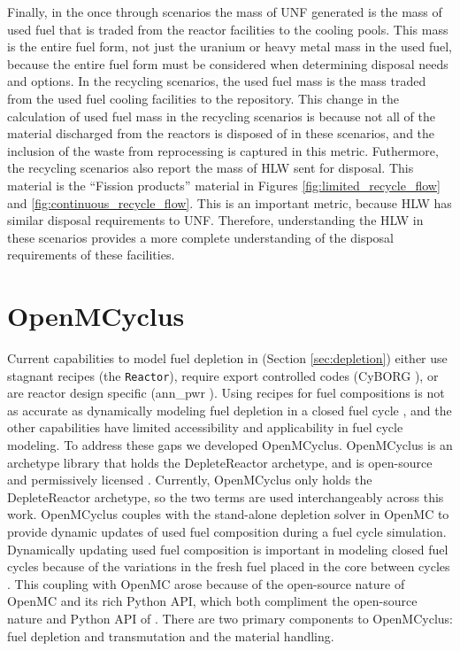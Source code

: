 Finally, in the once through scenarios the mass of \gls{UNF} generated is 
the mass of used fuel that is 
traded from the reactor facilities to the cooling pools. This mass is the 
entire fuel form, not just the uranium or heavy metal mass in the used 
fuel, because the entire fuel form must be considered when determining 
disposal needs and options. In the recycling scenarios, the used fuel 
mass is the mass traded from the used fuel cooling facilities 
to the repository. This change in the calculation of used fuel mass 
in the recycling scenarios is because not all of the material discharged 
from the reactors is disposed of in these scenarios, and the inclusion of 
the waste from reprocessing is captured in this metric. Futhermore, 
the recycling scenarios also report the mass of \gls{HLW} sent 
for disposal. This material is the ``Fission products'' material 
in Figures \ref{fig:limited_recycle_flow} and \ref{fig:continuous_recycle_flow}.
This is an important metric, because \gls{HLW} has similar 
disposal requirements to \gls{UNF}. Therefore, understanding the 
\gls{HLW} in these scenarios provides a more complete understanding 
of the disposal requirements of these facilities. 

\section{OpenMCyclus}\label{sec:openmcyclus}
Current capabilities to model fuel depletion in \Cyclus 
(Section \ref{sec:depletion})
either use stagnant recipes (the \Cycamore \texttt{Reactor}), require 
export controlled codes (CyBORG \cite{skutnik_cyborg_2016}), or 
are reactor design specific (ann\_pwr \cite{bae_deep_2020}). 
Using recipes for fuel compositions is not as accurate as 
dynamically modeling fuel depletion in a closed fuel 
cycle \cite{sunny_transition_2015}, and the other capabilities 
have limited accessibility and applicability in fuel cycle 
modeling. 
To address these gaps we developed OpenMCyclus. 
OpenMCyclus is an archetype library that holds the DepleteReactor 
archetype, and is open-source and permissively licensed 
\cite{bachmann_openmcyclus_2023}. 
Currently, OpenMCyclus only holds the DepleteReactor archetype, so 
the two terms are used interchangeably across this work. OpenMCyclus couples 
\Cyclus with the stand-alone depletion solver in OpenMC 
\cite{romano_depletion_2021} to provide 
dynamic updates of used fuel composition during a fuel cycle simulation.
Dynamically updating used fuel composition is important in 
modeling closed fuel cycles because of the variations in the 
fresh fuel placed in the core between cycles \cite{sunny_transition_2015}.
This coupling with OpenMC arose because 
of the open-source nature of OpenMC and its rich Python \gls{API}, 
which both compliment the open-source nature and Python \gls{API} 
of \Cyclus. 
There are two primary components to OpenMCyclus: fuel depletion and 
transmutation and the material handling. 

